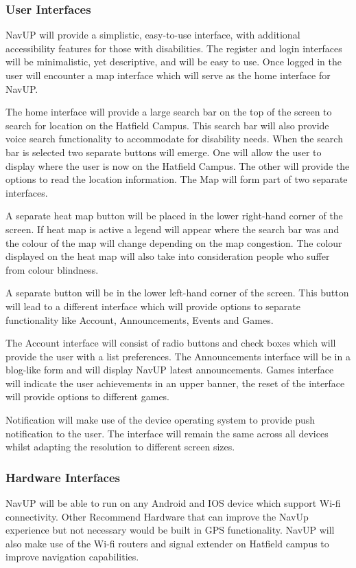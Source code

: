 \documentclass[12pt,a4paper]{article}
\begin{document}
		\subsubsection{User Interfaces}
			NavUP will provide a simplistic, easy-to-use interface, with additional accessibility features for those with disabilities. The register and login interfaces will be minimalistic, yet descriptive, and will be easy to use. Once logged in the user will encounter a map interface which will serve as the home interface for NavUP.\newline

The home interface will provide a large search bar on the top of the screen to search for location on the Hatfield Campus. This search bar will also provide voice search functionality to accommodate for disability needs. When the search bar is selected two separate buttons will emerge. One will allow the user to display where the user is now on the Hatfield Campus. The other will provide the options to read the location information. The Map will form part of two separate interfaces.\newline

A separate heat map button will be placed in the lower right-hand corner of the screen. If heat map is active a legend will appear where the search bar was and the colour of the map will change depending on the map congestion. The colour displayed on the heat map will also take into consideration people who suffer from colour blindness.\newline

A separate button will be in the lower left-hand corner of the screen. This button will lead to a different interface which will provide options to separate functionality like Account, Announcements, Events and Games.\newline

The Account interface will consist of radio buttons and check boxes which will provide the user with a list preferences. The Announcements interface will be in a blog-like form and will display NavUP latest announcements. Games interface will indicate the user achievements in an upper banner, the reset of the interface will provide options to different games.\newline

Notification will make use of the device operating system to provide push notification to the user. The interface will remain the same across all devices whilst adapting the resolution to different screen sizes.
		\subsubsection{Hardware Interfaces}
			NavUP will be able to run on any Android and IOS device which support Wi-fi connectivity. Other Recommend Hardware that can improve the NavUp experience but not necessary would be built in GPS functionality. NavUP will also make use of the Wi-fi routers and signal extender on Hatfield campus to improve navigation capabilities.
\end{document}
